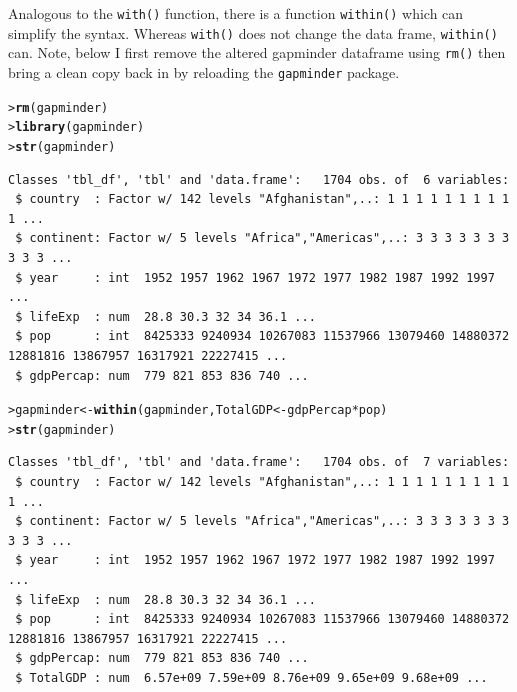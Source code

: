 \documentclass[12pt,oneside]{book}\usepackage[]{graphicx}\usepackage[]{color}
\makeatletter
\newcommand{\hlopt}[1]{\textcolor[rgb]{0,0,0}{#1}}%
\newcommand{\hlstd}[1]{\textcolor[rgb]{0.345,0.345,0.345}{#1}}%
\newcommand{\hlkwb}[1]{\textcolor[rgb]{0.69,0.353,0.396}{#1}}%
\newcommand{\hlkwd}[1]{\textcolor[rgb]{0.737,0.353,0.396}{\textbf{#1}}}%
\newenvironment{kframe}{%
 \def\at@end@of@kframe{}%
 \ifinner\ifhmode%
  \def\at@end@of@kframe{\end{minipage}}%
  \begin{minipage}{\columnwidth}%
 \fi\fi%
 \def\FrameCommand##1{\hskip\@totalleftmargin \hskip-\fboxsep
 \colorbox{shadecolor}{##1}\hskip-\fboxsep
     \hskip-\linewidth \hskip-\@totalleftmargin \hskip\columnwidth}%
 \MakeFramed {\advance\hsize-\width
   \@totalleftmargin\z@ \linewidth\hsize
   \@setminipage}}%
 {\par\unskip\endMakeFramed%
 \at@end@of@kframe}
\newenvironment{knitrout}{}{} %
\makeatother
\begin{document}
Analogous to the \verb+with()+ function, there is a function \verb+within()+ which can simplify the syntax. Whereas \verb+with()+ does not change the data frame, \verb+within()+ can. Note, below I first remove the altered gapminder dataframe using \verb+rm()+ then bring a clean copy back in by reloading the \verb+gapminder+ package.

\begin{knitrout}
\color{fgcolor}\begin{kframe}
\begin{alltt}
\hlstd{> }\hlkwd{rm}\hlstd{(gapminder)}
\hlstd{> }\hlkwd{library}\hlstd{(gapminder)}
\hlstd{> }\hlkwd{str}\hlstd{(gapminder)}
\end{alltt}
\begin{verbatim}
Classes 'tbl_df', 'tbl' and 'data.frame':	1704 obs. of  6 variables:
 $ country  : Factor w/ 142 levels "Afghanistan",..: 1 1 1 1 1 1 1 1 1 1 ...
 $ continent: Factor w/ 5 levels "Africa","Americas",..: 3 3 3 3 3 3 3 3 3 3 ...
 $ year     : int  1952 1957 1962 1967 1972 1977 1982 1987 1992 1997 ...
 $ lifeExp  : num  28.8 30.3 32 34 36.1 ...
 $ pop      : int  8425333 9240934 10267083 11537966 13079460 14880372 12881816 13867957 16317921 22227415 ...
 $ gdpPercap: num  779 821 853 836 740 ...
\end{verbatim}
\begin{alltt}
\hlstd{> }\hlstd{gapminder} \hlkwb{<-} \hlkwd{within}\hlstd{(gapminder, TotalGDP} \hlkwb{<-} \hlstd{gdpPercap} \hlopt{*} \hlstd{pop)}
\hlstd{> }\hlkwd{str}\hlstd{(gapminder)}
\end{alltt}
\begin{verbatim}
Classes 'tbl_df', 'tbl' and 'data.frame':	1704 obs. of  7 variables:
 $ country  : Factor w/ 142 levels "Afghanistan",..: 1 1 1 1 1 1 1 1 1 1 ...
 $ continent: Factor w/ 5 levels "Africa","Americas",..: 3 3 3 3 3 3 3 3 3 3 ...
 $ year     : int  1952 1957 1962 1967 1972 1977 1982 1987 1992 1997 ...
 $ lifeExp  : num  28.8 30.3 32 34 36.1 ...
 $ pop      : int  8425333 9240934 10267083 11537966 13079460 14880372 12881816 13867957 16317921 22227415 ...
 $ gdpPercap: num  779 821 853 836 740 ...
 $ TotalGDP : num  6.57e+09 7.59e+09 8.76e+09 9.65e+09 9.68e+09 ...
\end{verbatim}
\end{kframe}
\end{knitrout}
\end{document}
